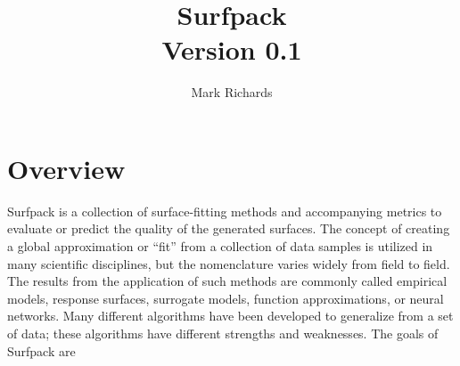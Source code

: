 \documentclass{article}
\begin{document}
\title{Surfpack\\
  Version 0.1}

\author{Mark Richards}

\maketitle

\pagebreak

\section {Overview}\label{sec:overview}
Surfpack is a collection of surface-fitting methods and accompanying metrics to evaluate or predict the quality of the generated surfaces.  The concept of creating a global approximation or ``fit'' from a collection of data samples is utilized in many scientific disciplines, but the nomenclature varies widely from field to field.  The results from the application of such methods are commonly called empirical models, response surfaces, surrogate models, function approximations, or neural networks.  Many different algorithms have been developed to generalize from a set of data; these algorithms have different strengths and weaknesses.  The goals of Surfpack are
\end{document}
